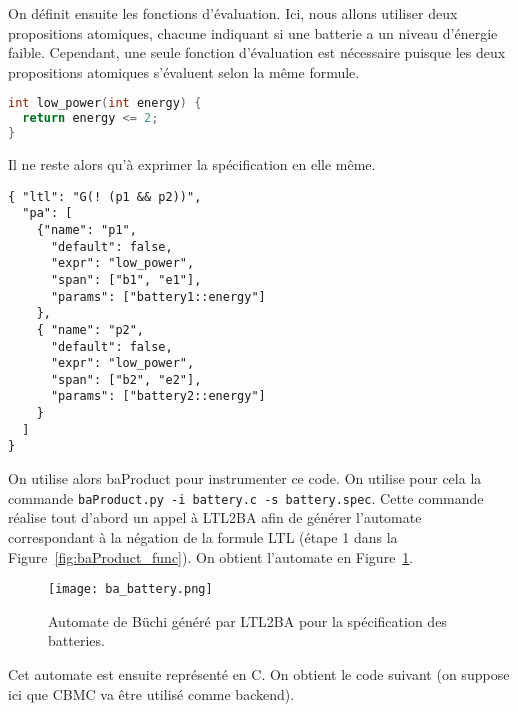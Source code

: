On définit ensuite les fonctions d'évaluation. Ici, nous allons utiliser deux
propositions atomiques, chacune indiquant si une batterie a un niveau
d'énergie faible. Cependant, une seule fonction d'évaluation est nécessaire
puisque les deux propositions atomiques s'évaluent selon la même formule.

\begin{lstlisting}[language=C, frame=single, caption=Fonction d'évaluation]
int low_power(int energy) {
  return energy <= 2;
}
\end{lstlisting}

Il ne reste alors qu'à exprimer la spécification en elle même.

\begin{lstlisting}[frame=single, caption=Spécification]
{ "ltl": "G(! (p1 && p2))",
  "pa": [
    {"name": "p1",
      "default": false,
      "expr": "low_power",
      "span": ["b1", "e1"],
      "params": ["battery1::energy"]
    },
    { "name": "p2",
      "default": false,
      "expr": "low_power",
      "span": ["b2", "e2"],
      "params": ["battery2::energy"]
    }
  ]
}
\end{lstlisting}

On utilise alors baProduct pour instrumenter ce code. On utilise pour cela
la commande \texttt{baProduct.py -i battery.c -s battery.spec}. Cette commande
réalise tout d'abord un appel à LTL2BA afin de générer l'automate correspondant
à la négation de la formule LTL (étape 1 dans la
Figure~\ref{fig:baProduct_func}). On obtient l'automate en
Figure~\ref{fig:ba_battery}.

\begin{figure}[ht]
\begin{center}
  \texttt{[image: ba\_battery.png]}
\end{center}
\caption{Automate de Büchi généré par LTL2BA pour la spécification des
batteries.}
\label{fig:ba_battery}
\end{figure}

Cet automate est ensuite représenté en C. On obtient le code suivant (on suppose
ici que CBMC va être utilisé comme backend).

